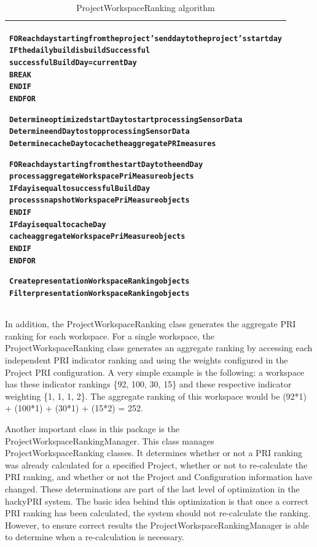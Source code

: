 \begin{table}[htbp]
  \begin{center}
    \caption{ProjectWorkspaceRanking algorithm}
    \label{table:hackyPri-ProjectWorkspaceRanking-algorithm}
    \begin{tabular}{|p{14.0cm}|} \hline
\begin{alltt}{\scriptsize{}
FOR each day starting from the project's end day to the project's start day
  IF the daily build is buildSuccessful
    successfulBuildDay = currentDay
    BREAK
  END IF
END FOR

Determine optimized startDay to start processing Sensor Data
Determine endDay to stop processing Sensor Data
Determine cacheDay to cache the aggregate PRI measures

FOR each day starting from the startDay to the endDay
  process aggregate WorkspacePriMeasure objects
  IF day is equal to successfulBuildDay
    process snapshot WorkspacePriMeasure objects
  END IF
  IF day is equal to cacheDay
    cache aggregate WorkspacePriMeasure objects
  END IF
END FOR 

Create presentation WorkspaceRanking objects
Filter presentation WorkspaceRanking objects
}\end{alltt}
\\ \hline
    \end{tabular}
  \end{center}
\end{table}

In addition, the ProjectWorkspaceRanking class generates the aggregate PRI
ranking for each workspace. For a single workspace, the
ProjectWorkspaceRanking class generates an aggregate ranking by accessing
each independent PRI indicator ranking and using the weights configured in
the Project PRI configuration. A very simple example is the following: a
workspace has these indicator rankings \{92, 100, 30, 15\} and these
respective indicator weighting \{1, 1, 1, 2\}. The aggregate ranking of
this workspace would be (92*1) + (100*1) + (30*1) + (15*2) = 252.

Another important class in this package is the
ProjectWorkspaceRankingManager. This class manages ProjectWorkspaceRanking
classes. It determines whether or not a PRI ranking was already calculated
for a specified Project, whether or not to re-calculate the PRI ranking,
and whether or not the Project and Configuration information have changed.
These determinations are part of the last level of optimization in the
hackyPRI system. The basic idea behind this optimization is that once a
correct PRI ranking has been calculated, the system should not re-calculate
the ranking. However, to ensure correct results the
ProjectWorkspaceRankingManager is able to determine when a re-calculation
is necessary. 



